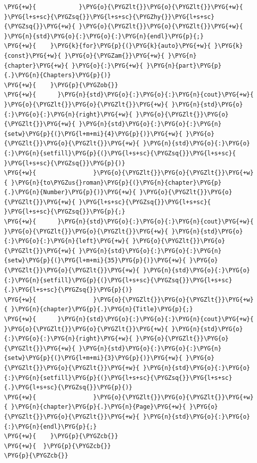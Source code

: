 \begin{itemize}
\begin{codeblockbg}
\begin{Verbatim}[commandchars=\\\{\},breaklines=true,breakanywhere=true,fontsize=\codefont,xleftmargin=17bp]
\PYG{+w}{            }\PYG{o}{\PYGZlt{}}\PYG{o}{\PYGZlt{}}\PYG{+w}{ }\PYG{l+s+sc}{\PYGZsq{}}\PYG{l+s+sc}{\PYGZhy{}}\PYG{l+s+sc}{\PYGZsq{}}\PYG{+w}{ }\PYG{o}{\PYGZlt{}}\PYG{o}{\PYGZlt{}}\PYG{+w}{ }\PYG{n}{std}\PYG{o}{:}\PYG{o}{:}\PYG{n}{endl}\PYG{p}{;}
\PYG{+w}{    }\PYG{k}{for}\PYG{p}{(}\PYG{k}{auto}\PYG{+w}{ }\PYG{k}{const}\PYG{+w}{ }\PYG{o}{\PYGZam{}}\PYG{+w}{ }\PYG{n}{chapter}\PYG{+w}{ }\PYG{o}{:}\PYG{+w}{ }\PYG{n}{part}\PYG{p}{.}\PYG{n}{Chapters}\PYG{p}{)}
\PYG{+w}{    }\PYG{p}{\PYGZob{}}
\PYG{+w}{      }\PYG{n}{std}\PYG{o}{:}\PYG{o}{:}\PYG{n}{cout}\PYG{+w}{ }\PYG{o}{\PYGZlt{}}\PYG{o}{\PYGZlt{}}\PYG{+w}{ }\PYG{n}{std}\PYG{o}{:}\PYG{o}{:}\PYG{n}{right}\PYG{+w}{ }\PYG{o}{\PYGZlt{}}\PYG{o}{\PYGZlt{}}\PYG{+w}{ }\PYG{n}{std}\PYG{o}{:}\PYG{o}{:}\PYG{n}{setw}\PYG{p}{(}\PYG{l+m+mi}{4}\PYG{p}{)}\PYG{+w}{ }\PYG{o}{\PYGZlt{}}\PYG{o}{\PYGZlt{}}\PYG{+w}{ }\PYG{n}{std}\PYG{o}{:}\PYG{o}{:}\PYG{n}{setfill}\PYG{p}{(}\PYG{l+s+sc}{\PYGZsq{}}\PYG{l+s+sc}{ }\PYG{l+s+sc}{\PYGZsq{}}\PYG{p}{)}
\PYG{+w}{                }\PYG{o}{\PYGZlt{}}\PYG{o}{\PYGZlt{}}\PYG{+w}{ }\PYG{n}{to\PYGZus{}roman}\PYG{p}{(}\PYG{n}{chapter}\PYG{p}{.}\PYG{n}{Number}\PYG{p}{)}\PYG{+w}{ }\PYG{o}{\PYGZlt{}}\PYG{o}{\PYGZlt{}}\PYG{+w}{ }\PYG{l+s+sc}{\PYGZsq{}}\PYG{l+s+sc}{ }\PYG{l+s+sc}{\PYGZsq{}}\PYG{p}{;}
\PYG{+w}{      }\PYG{n}{std}\PYG{o}{:}\PYG{o}{:}\PYG{n}{cout}\PYG{+w}{ }\PYG{o}{\PYGZlt{}}\PYG{o}{\PYGZlt{}}\PYG{+w}{ }\PYG{n}{std}\PYG{o}{:}\PYG{o}{:}\PYG{n}{left}\PYG{+w}{ }\PYG{o}{\PYGZlt{}}\PYG{o}{\PYGZlt{}}\PYG{+w}{ }\PYG{n}{std}\PYG{o}{:}\PYG{o}{:}\PYG{n}{setw}\PYG{p}{(}\PYG{l+m+mi}{35}\PYG{p}{)}\PYG{+w}{ }\PYG{o}{\PYGZlt{}}\PYG{o}{\PYGZlt{}}\PYG{+w}{ }\PYG{n}{std}\PYG{o}{:}\PYG{o}{:}\PYG{n}{setfill}\PYG{p}{(}\PYG{l+s+sc}{\PYGZsq{}}\PYG{l+s+sc}{.}\PYG{l+s+sc}{\PYGZsq{}}\PYG{p}{)}
\PYG{+w}{                }\PYG{o}{\PYGZlt{}}\PYG{o}{\PYGZlt{}}\PYG{+w}{ }\PYG{n}{chapter}\PYG{p}{.}\PYG{n}{Title}\PYG{p}{;}
\PYG{+w}{      }\PYG{n}{std}\PYG{o}{:}\PYG{o}{:}\PYG{n}{cout}\PYG{+w}{ }\PYG{o}{\PYGZlt{}}\PYG{o}{\PYGZlt{}}\PYG{+w}{ }\PYG{n}{std}\PYG{o}{:}\PYG{o}{:}\PYG{n}{right}\PYG{+w}{ }\PYG{o}{\PYGZlt{}}\PYG{o}{\PYGZlt{}}\PYG{+w}{ }\PYG{n}{std}\PYG{o}{:}\PYG{o}{:}\PYG{n}{setw}\PYG{p}{(}\PYG{l+m+mi}{3}\PYG{p}{)}\PYG{+w}{ }\PYG{o}{\PYGZlt{}}\PYG{o}{\PYGZlt{}}\PYG{+w}{ }\PYG{n}{std}\PYG{o}{:}\PYG{o}{:}\PYG{n}{setfill}\PYG{p}{(}\PYG{l+s+sc}{\PYGZsq{}}\PYG{l+s+sc}{.}\PYG{l+s+sc}{\PYGZsq{}}\PYG{p}{)}
\PYG{+w}{                }\PYG{o}{\PYGZlt{}}\PYG{o}{\PYGZlt{}}\PYG{+w}{ }\PYG{n}{chapter}\PYG{p}{.}\PYG{n}{Page}\PYG{+w}{ }\PYG{o}{\PYGZlt{}}\PYG{o}{\PYGZlt{}}\PYG{+w}{ }\PYG{n}{std}\PYG{o}{:}\PYG{o}{:}\PYG{n}{endl}\PYG{p}{;}
\PYG{+w}{    }\PYG{p}{\PYGZcb{}}
\PYG{+w}{  }\PYG{p}{\PYGZcb{}}
\PYG{p}{\PYGZcb{}}
\end{Verbatim}
\end{codeblockbg}

\end{itemize}


